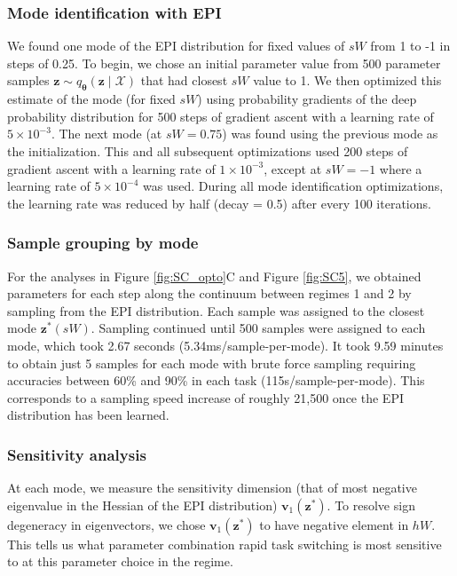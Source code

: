 \documentclass[11pt]{article}
\begin{document}
\subsubsection{Mode identification with EPI} \label{methods_sc_regime}
We found one mode of the EPI distribution for fixed values of $sW$ from 1 to -1 in steps of 0.25.
To begin, we chose an initial parameter value from 500 parameter samples $\mathbf{z} \sim q_{\bm{\theta}}(\mathbf{z} \mid \mathcal{X})$ that had closest $sW$ value to 1.
We then optimized this estimate of the mode (for fixed $sW$) using probability gradients of the deep probability distribution for 500 steps of gradient ascent with a learning rate of $5 \times 10^{-3}$.
The next mode (at $sW = 0.75$) was found using the previous mode as the initialization.
This and all subsequent optimizations used 200 steps of gradient ascent with a learning rate of $1 \times 10^{-3}$, except at $sW = -1$ where a learning rate of $5 \times 10^{-4}$ was used.
During all mode identification optimizations, the learning rate was reduced by half (decay = 0.5) after every 100 iterations.

\subsubsection{Sample grouping by mode} \label{methods_sc_group}
For the analyses in Figure \ref{fig:SC_opto}C and Figure \ref{fig:SC5}, we obtained parameters for each step along the continuum between regimes 1 and 2 by sampling from the EPI distribution.
Each sample was assigned to the closest mode $\mathbf{z}^*(sW)$.
Sampling continued until 500 samples were assigned to each mode, which took 2.67 seconds (5.34ms/sample-per-mode).
It took 9.59 minutes to obtain just 5 samples for each mode with brute force sampling requiring accuracies between 60\% and 90\% in each task (115s/sample-per-mode).
This corresponds to a sampling speed increase of roughly 21,500 once the EPI distribution has been learned.

\subsubsection{Sensitivity analysis} \label{methods_sc_hessian}
At each mode, we measure the sensitivity dimension (that of most negative eigenvalue in the Hessian of the EPI distribution) $\mathbf{v}_1(\mathbf{z}^*)$.
To resolve sign degeneracy in eigenvectors, we chose $\mathbf{v}_1(\mathbf{z}^*)$ to have negative element in $hW$.
This tells us what parameter combination rapid task switching is most sensitive to at this parameter choice in the regime.
\end{document}

